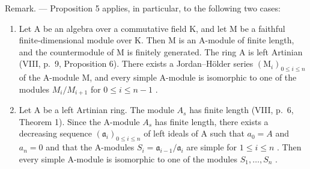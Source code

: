 Remark. --- Proposition 5 applies, in particular, to the following two cases:

\begin{enumerate}
\def\labelenumi{\alph{enumi})}
\item
  Let A be an algebra over a commutative field K, and let M be a faithful finite-dimensional module over K. Then M is an A-module of finite length, and the countermodule of M is finitely generated. The ring A is left Artinian (VIII, p.~9, Proposition 6). There exists a Jordan--Hölder series \((\mathrm{M}_{i})_{0\leqslant i\leqslant n}\) of the A-module M, and every simple A-module is isomorphic to one of the modules \(M_{i}/M_{i+1}\) for \(0\leqslant i\leqslant n-1\) .
\item
  Let A be a left Artinian ring. The module \(A_{s}\) has finite length (VIII, p.~6, Theorem 1). Since the A-module \(A_{s}\) has finite length, there exists a decreasing sequence \((\mathfrak{a}_{i})_{0\leqslant i\leqslant n}\) of left ideals of A such that \(a_{0}=A\) and \(a_{n}=0\) and that the A-modules \(S_{i}=\mathfrak{a}_{i-1}/\mathfrak{a}_{i}\) are simple for \(1\leqslant i\leqslant n\) . Then every simple A-module is isomorphic to one of the modules \(S_{1},\ldots,S_{n}\) .
\end{enumerate}

